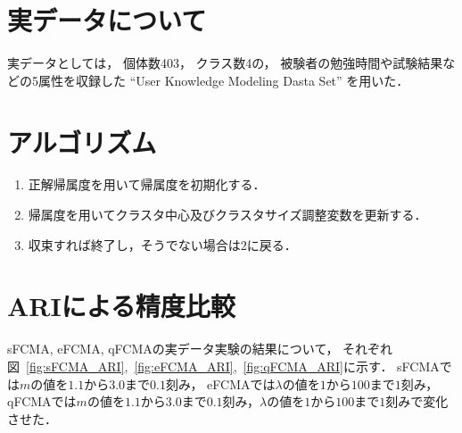 \documentclass[a4j,12pt,dvipdfmx,oneside]{jsbook}
\theoremstyle{definition}
\begin{document}
 \section{実データについて}\label{sec:about_real_data}
 実データとしては，
 個体数403，
 クラス数4の，
 被験者の勉強時間や試験結果などの5属性を収録した
 ``User Knowledge Modeling Dasta Set''
 を用いた．
 
 \section{アルゴリズム}\label{sec:suggest_algorythm} 
  \begin{enumerate}
  \item 正解帰属度を用いて帰属度を初期化する．
  \item 帰属度を用いてクラスタ中心及びクラスタサイズ調整変数を更新する．
  \item 収束すれば終了し，そうでない場合は$2$に戻る．
  \end{enumerate}
 \section{ARIによる精度比較}\label{sec:ari_compare}

sFCMA, eFCMA, qFCMAの実データ実験の結果について，
それぞれ図~\ref{fig:sFCMA_ARI},~\ref{fig:eFCMA_ARI},~\ref{fig:qFCMA_ARI}に示す．
sFCMAでは$m$の値を$1.1$から$3.0$まで$0.1$刻み，
eFCMAでは$\lambda$の値を$1$から$100$まで$1$刻み，
qFCMAでは$m$の値を$1.1$から$3.0$まで$0.1$刻み，$\lambda$の値を$1$から$100$まで$1$刻みで変化させた．
\end{document}
